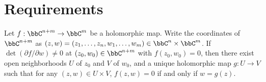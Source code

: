 \section{Requirements}

    \begin{theorem}\label{thm:holomorphic_implicit_function_theorem}
        Let \(f: \bbC^{n+m} \to \bbC^m\) be a holomorphic map. 
        Write the coordinates of \(\bbC^{n+m}\) as \((z,w) = (z_1, \ldots, z_n, w_1, \ldots, w_m) \in \bbC^n \times \bbC^m\).
        If \(\det(\partial f/\partial w) \neq 0\) at \((z_0, w_0) \in \bbC^{n+m}\) with \(f(z_0, w_0) = 0\),
        then there exist open neighborhoods \(U\) of \(z_0\) and \(V\) of \(w_0\), and a unique holomorphic map \(g: U \to V\) such that for any \((z, w) \in U \times V\), \(f(z, w) = 0\) if and only if \(w = g(z)\).
    \end{theorem}

